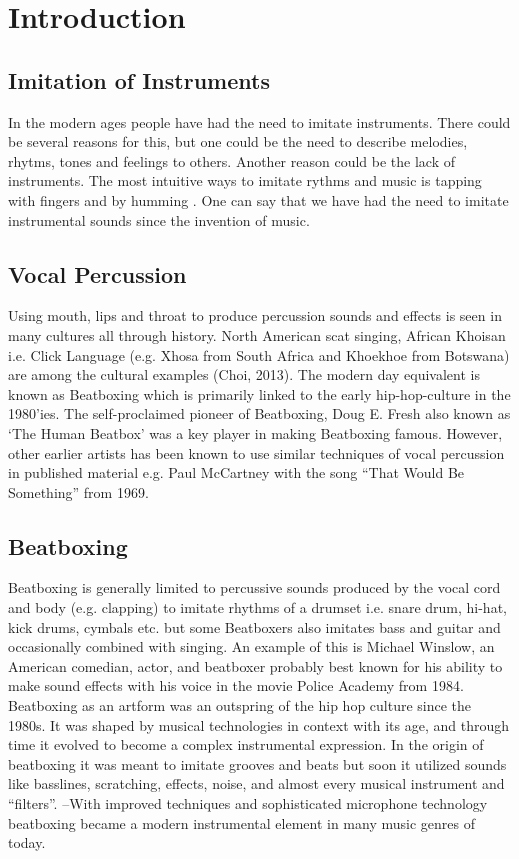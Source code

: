 \section{ Introduction }
\subsection{ Imitation of Instruments }
In the modern ages people have had the need to imitate instruments. There could be several reasons for this, but one could be the need to describe melodies, rhytms, tones and feelings to others. Another reason could be the lack of instruments. The most intuitive ways to imitate rythms and music is tapping with fingers and by humming \citep{Sinyor05}. One can say that we have had the need to imitate instrumental sounds since the invention of music.
\subsection{ Vocal Percussion }
Using mouth, lips and throat to produce percussion sounds and effects is seen in many cultures all through history. North American scat singing, African Khoisan i.e. Click Language (e.g. Xhosa from South Africa and Khoekhoe from Botswana) are among the cultural examples (Choi, 2013).	
The modern day equivalent is known as Beatboxing which is primarily linked to the early hip-hop-culture in the 1980’ies. The self-proclaimed pioneer of Beatboxing, Doug E. Fresh also known as ‘The Human Beatbox’ was a key player in making Beatboxing famous. However, other earlier artists has been known to use similar techniques of vocal percussion in published material e.g. Paul McCartney with the song “That Would Be Something” from 1969.
\subsection{ Beatboxing }
Beatboxing is generally limited to percussive sounds produced by the vocal cord and body (e.g. clapping) to imitate rhythms of a drumset i.e. snare drum, hi-hat, kick drums, cymbals etc. but some Beatboxers also imitates bass and guitar and occasionally combined with singing. An example of this is Michael Winslow, an American comedian, actor, and beatboxer probably best known for his ability to make sound effects with his voice in the movie Police Academy from 1984. Beatboxing as an artform was an outspring of the hip hop culture since the 1980s. It was shaped by musical technologies in context with its age, and through time it evolved to become a complex instrumental expression. In the origin of beatboxing it was meant to imitate grooves and beats but soon it utilized sounds like basslines, scratching, effects, noise, and almost every musical instrument and “filters”. –With improved techniques and sophisticated microphone technology beatboxing became a modern instrumental element in many music genres of today.
